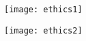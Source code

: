 
\begin{figure}[!ht]
\centering
\texttt{[image: ethics1]}
\caption{
        }
\end{figure}




\begin{figure}[!ht]
\centering
\texttt{[image: ethics2]}
\caption{
        }
\end{figure}
